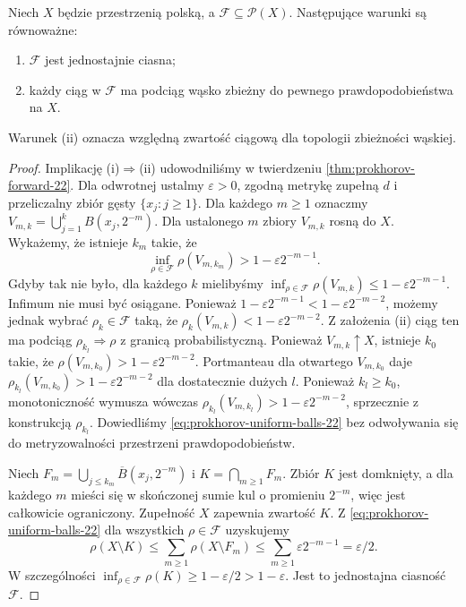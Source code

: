 \begin{twierdzenie}
\label{thm:prokhorov-22}
Niech $X$ będzie przestrzenią polską, a
$\mathcal F\subseteq\mathcal P(X)$.
Następujące warunki są równoważne:
\begin{enumerate}[label=(\roman*)]
\item $\mathcal F$ jest jednostajnie ciasna;
\item każdy ciąg w $\mathcal F$ ma podciąg wąsko
zbieżny do pewnego prawdopodobieństwa na $X$.
\end{enumerate}
Warunek (ii) oznacza względną zwartość
ciągową dla topologii zbieżności wąskiej.
\end{twierdzenie}
\begin{proof}
Implikację (i)$\Rightarrow$(ii) udowodniliśmy w twierdzeniu
\ref{thm:prokhorov-forward-22}. Dla odwrotnej
ustalmy $\varepsilon>0$, zgodną metrykę zupełną $d$
i przeliczalny zbiór gęsty $\{x_j:j\ge1\}$.
Dla każdego $m\ge1$ oznaczmy
$V_{m,k}=\bigcup_{j=1}^k B(x_j,2^{-m})$.
Dla ustalonego $m$ zbiory $V_{m,k}$ rosną do $X$.
Wykażemy, że istnieje $k_m$ takie, że
\begin{equation}\label{eq:prokhorov-uniform-balls-22}
\inf_{\rho\in\mathcal F}\rho(V_{m,k_m})
>1-\varepsilon2^{-m-1}.
\end{equation}
Gdyby tak nie było, dla każdego $k$ mielibyśmy
$\inf_{\rho\in\mathcal F}\rho(V_{m,k})
\le1-\varepsilon2^{-m-1}$.
Infimum nie musi być osiągane. Ponieważ
$1-\varepsilon2^{-m-1}<1-\varepsilon2^{-m-2}$,
możemy jednak wybrać $\rho_k\in\mathcal F$ taką, że
$\rho_k(V_{m,k})<1-\varepsilon2^{-m-2}$.
Z założenia (ii) ciąg ten ma podciąg
$\rho_{k_l}\Rightarrow\rho$ z granicą probabilistyczną.
Ponieważ $V_{m,k}\uparrow X$, istnieje $k_0$ takie,
że $\rho(V_{m,k_0})>1-\varepsilon2^{-m-2}$.
Portmanteau dla otwartego $V_{m,k_0}$ daje
$\rho_{k_l}(V_{m,k_0})>1-\varepsilon2^{-m-2}$
dla dostatecznie dużych $l$. Ponieważ $k_l\ge k_0$,
monotoniczność wymusza wówczas
$\rho_{k_l}(V_{m,k_l})>1-\varepsilon2^{-m-2}$,
sprzecznie z konstrukcją $\rho_{k_l}$.
Dowiedliśmy \eqref{eq:prokhorov-uniform-balls-22}
bez odwoływania się do metryzowalności
przestrzeni prawdopodobieństw.

Niech $F_m=\bigcup_{j\le k_m}\overline B(x_j,2^{-m})$
i $K=\bigcap_{m\ge1}F_m$. Zbiór $K$ jest domknięty,
a dla każdego $m$ mieści się w skończonej sumie kul
o promieniu $2^{-m}$, więc jest całkowicie ograniczony.
Zupełność $X$ zapewnia zwartość $K$.
Z \eqref{eq:prokhorov-uniform-balls-22} dla wszystkich
$\rho\in\mathcal F$ uzyskujemy
\[
 \rho(X\setminus K)\le\sum_{m\ge1}\rho(X\setminus F_m)
 \le\sum_{m\ge1}\varepsilon2^{-m-1}
=\varepsilon/2.
\]
W szczególności $\inf_{\rho\in\mathcal F}\rho(K)
\ge1-\varepsilon/2>1-\varepsilon$.
Jest to jednostajna ciasność $\mathcal F$.
\end{proof}

